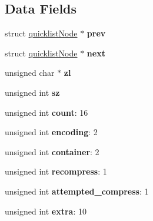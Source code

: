 \subsection*{Data Fields}
\begin{DoxyCompactItemize}
\item 
\mbox{\label{structquicklistNode_acf506a58b1cf34e897b6d95a5f8684de}} 
struct \hyperlink{structquicklistNode}{quicklist\+Node} $\ast$ {\bfseries prev}
\item 
\mbox{\label{structquicklistNode_a873015968ea9b9beafdd4ed679b55d1d}} 
struct \hyperlink{structquicklistNode}{quicklist\+Node} $\ast$ {\bfseries next}
\item 
\mbox{\label{structquicklistNode_ac0273a27d0d72fc290d00b01a95e1b7b}} 
unsigned char $\ast$ {\bfseries zl}
\item 
\mbox{\label{structquicklistNode_a45cf87a732a821df88c116a4ed2a12c2}} 
unsigned int {\bfseries sz}
\item 
\mbox{\label{structquicklistNode_a3fdaced8ae4a78106223abb6f3be3c62}} 
unsigned int {\bfseries count}\+: 16
\item 
\mbox{\label{structquicklistNode_a9f1f04ffad64fdd690f80559d2c7b072}} 
unsigned int {\bfseries encoding}\+: 2
\item 
\mbox{\label{structquicklistNode_aec7a11507fc9f43595094cd27077ccc8}} 
unsigned int {\bfseries container}\+: 2
\item 
\mbox{\label{structquicklistNode_aeca3c3bbe1e81ab82de62baf0c15b20c}} 
unsigned int {\bfseries recompress}\+: 1
\item 
\mbox{\label{structquicklistNode_a979d59af685663ec408f2591b76f0d02}} 
unsigned int {\bfseries attempted\+\_\+compress}\+: 1
\item 
\mbox{\label{structquicklistNode_a896f473bc29f7734091556355f3460dd}} 
unsigned int {\bfseries extra}\+: 10
\end{DoxyCompactItemize}


